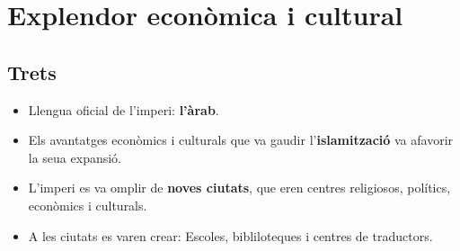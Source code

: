 \section{Explendor econòmica i
cultural}\label{explendor-econuxf2mica-i-cultural}

\subsection{Trets}\label{trets}

\begin{itemize}
\itemsep1pt\parskip0pt
\item
  Llengua oficial de l'imperi: \textbf{l'àrab}.
\item
  Els avantatges econòmics i culturals que va gaudir
  l'\textbf{islamització} va afavorir la seua expansió.
\item
  L'imperi es va omplir de \textbf{noves ciutats}, que eren centres
  religiosos, polítics, econòmics i culturals.
\item
  A les ciutats es varen crear: Escoles, bibliloteques i centres de
  traductors.
\end{itemize}
